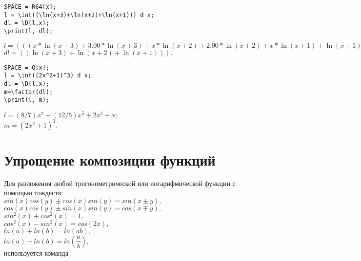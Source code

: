 \begin{verbatim}
SPACE = R64[x];
l = \int((\ln(x+3)+\ln(x+2)+\ln(x+1))) d x;
dl = \D(l,x);
\print(l, dl);
\end{verbatim}
\vspace*{-3mm}

{
$l = (((x*\ln(x+3)+3.00*\ln(x+3)+x*\ln(x+2)+2.00*\ln(x+2)+x*\ln(x+1)+\ln(x+1))-3x)); $\\
\hspace*{4mm} $dl = ((\ln(x+3)+\ln(x+2)+\ln(x+1))). $
}

\begin{verbatim}
SPACE = Q[x];
l = \int((2x^2+1)^3) d x;
dl = \D(l,x);
m=\factor(dl);
\print(l, m);
\end{verbatim}
\vspace*{-3mm}

{$l = (8/7)x^7+(12/5)x^5+2x^3+x; $\\
\hspace*{4mm} $m = (2x^2+1)^3. $}



\section{Упрощение композиции функций}
Для разложения любой тригонометрической или логарифмической функции с помощью тождеств:\\
$sin(x)cos(y) \pm cos(x)sin(y) = sin(x \pm y),$ \\
$cos(x)cos(y) \pm sin(x)sin(y) = cos(x \mp y),$ \\
$sin^2(x) + cos^2(x) = 1,$ \\
$cos^2(x) - sin^2(x) = cos(2x),$ \\
$ln(a) + ln(b) = ln(ab),$ \\
$ln(a) - ln(b) = ln(\dfrac{a}{b}),$ \\
используется команда  

